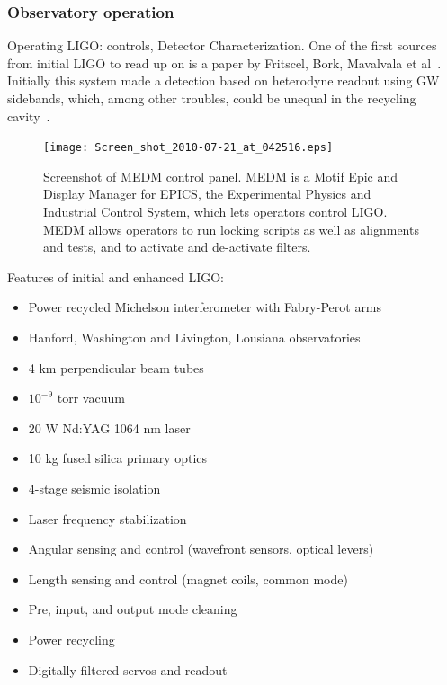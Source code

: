             \subsubsection{Observatory operation}
            \label{observatory_operation}

                Operating LIGO: controls, Detector Characterization. One of the first sources from initial LIGO to read up on is a paper by Fritscel, Bork, Mavalvala et al~\cite{ReadoutGWA}. Initially this system made a detection based on heterodyne readout using GW sidebands, which, among other troubles, could be unequal in the recycling cavity~\cite{MeadorsHanford2005}.

	\begin{figure}
	\begin{center}
	\texttt{[image: Screen\_shot\_2010-07-21\_at\_042516.eps]}
	\caption{Screenshot of MEDM control panel. MEDM is a Motif Epic and Display Manager for EPICS, the Experimental Physics and Industrial Control System, which lets operators control LIGO. MEDM allows operators to run locking scripts as well as alignments and tests, and to activate and de-activate filters.}
	\label{ScreenshotMEDM}
	\end{center}
	\end{figure}

Features of initial and enhanced LIGO:
\begin{itemize}
\item Power recycled Michelson interferometer with Fabry-Perot arms
\item Hanford, Washington and Livington, Lousiana observatories
\item 4 km perpendicular beam tubes
\item $10^{−9}$ torr vacuum
\item 20 W Nd:YAG 1064 nm laser
\item 10 kg fused silica primary optics
\item 4-stage seismic isolation
\item Laser frequency stabilization
\item Angular sensing and control (wavefront sensors, optical levers)
\item Length sensing and control (magnet coils, common mode)
\item Pre, input, and output mode cleaning
\item Power recycling
\item Digitally filtered servos and readout
\end{itemize}


